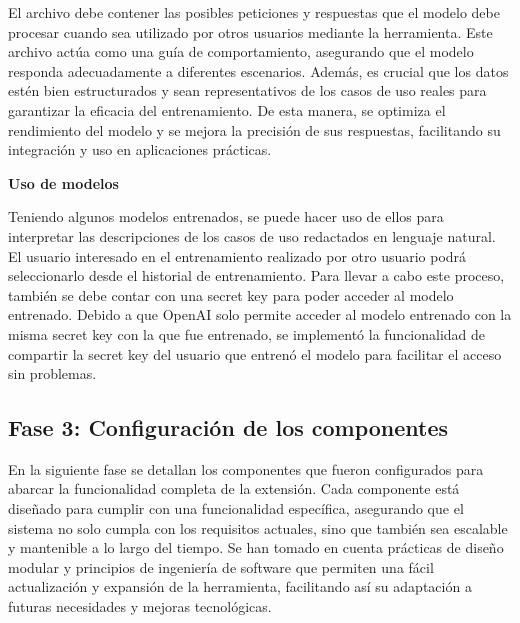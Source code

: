 El archivo debe contener las posibles peticiones y respuestas que el modelo debe procesar cuando sea utilizado por otros usuarios mediante la herramienta. Este archivo actúa como una guía de comportamiento, asegurando que el modelo responda adecuadamente a diferentes escenarios. Además, es crucial que los datos estén bien estructurados y sean representativos de los casos de uso reales para garantizar la eficacia del entrenamiento. De esta manera, se optimiza el rendimiento del modelo y se mejora la precisión de sus respuestas, facilitando su integración y uso en aplicaciones prácticas.

\textbf{Uso de modelos}

Teniendo algunos modelos entrenados, se puede hacer uso de ellos para interpretar las descripciones de los casos de uso redactados en lenguaje natural. El usuario interesado en el entrenamiento realizado por otro usuario podrá seleccionarlo desde el historial de entrenamiento. Para llevar a cabo este proceso, también se debe contar con una secret key para poder acceder al modelo entrenado. Debido a que OpenAI solo permite acceder al modelo entrenado con la misma secret key con la que fue entrenado, se implementó la funcionalidad de compartir la secret key del usuario que entrenó el modelo para facilitar el acceso sin problemas.

\subsection{Fase 3: Configuración de los componentes}

En la siguiente fase se detallan los componentes que fueron configurados para abarcar la funcionalidad completa de la extensión. Cada componente está diseñado para cumplir con una funcionalidad específica, asegurando que el sistema no solo cumpla con los requisitos actuales, sino que también sea escalable y mantenible a lo largo del tiempo. Se han tomado en cuenta prácticas de diseño modular y principios de ingeniería de software que permiten una fácil actualización y expansión de la herramienta, facilitando así su adaptación a futuras necesidades y mejoras tecnológicas.

